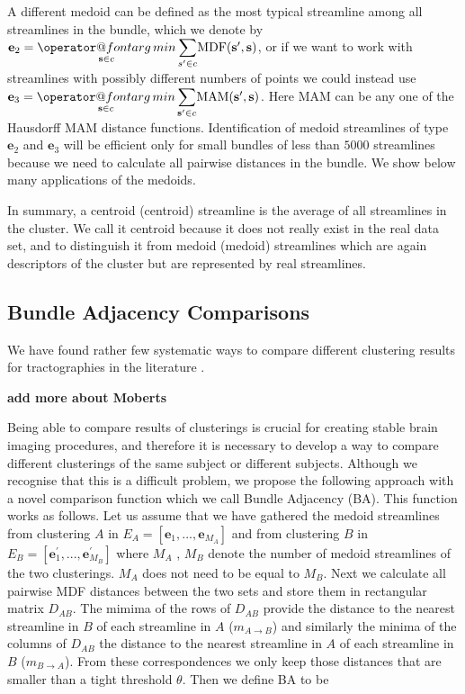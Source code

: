 \documentclass{bioinfo}
\makeatletter
\def\argmin{\mathop{\operator@font arg\,min}}
\makeatother
\begin{document}
\begin{methods}
A different medoid can be defined as the most typical streamline among
all streamlines in the bundle, which we denote by
$\mathbf{e}_{2}={\displaystyle \argmin_{\mathbf{s} \in
    c}}\,{\displaystyle \sum_{s'\in
    c}}\mathrm{MDF}(\mathbf{s'},\mathbf{s})$, or if we want to work with
streamlines with possibly different numbers of points we could instead
use $\mathbf{e}_{3}={\displaystyle \argmin_{\mathbf{s} \in
    c}}\,{\displaystyle \sum_{\mathbf{s'}\in
    c}}\mathrm{MAM}(\mathbf{s'},\mathbf{s})$.  Here $\mathrm{MAM}$ can
be any one of the Hausdorff MAM distance functions.  Identification of
medoid streamlines of type $\mathbf{e}_{2}$ and $\mathbf{e}_{3}$ will
be efficient only for small bundles of less than $5000$ streamlines
because we need to calculate all pairwise distances in the bundle. We
show below many applications of the medoids.

In summary, a centroid (centroid) streamline is the average of all
streamlines in the cluster. We call it centroid because it does not
really exist in the real data set, and to distinguish it from medoid
(medoid) streamlines which are again descriptors of the cluster but are
represented by real streamlines.

\subsection{Bundle Adjacency Comparisons\label{sub:Tightness-comparisons-1}}

We have found rather few systematic ways to compare different clustering
results for tractographies in the literature
\citep{moberts2005evaluation}.  

\textbf{add more about Moberts}

Being able to compare results of clusterings is crucial for creating
stable brain imaging procedures, and therefore it is necessary to
develop a way to compare different clusterings of the same subject or
different subjects. Although we recognise that this is a difficult
problem, we propose the following approach with a novel comparison
function which we call Bundle Adjacency (BA). This function works as
follows. Let us assume that we have gathered the medoid streamlines from
clustering $A$ in $E_{A}=[\mathbf{e}_{1},...,\mathbf{e}_{M_{A}}]$ and
from clustering $B$ in
$E_{B}=[\mathbf{e}_{1}^{'},...,\mathbf{e}_{M_{B}}^{'}]$ where $M_A$ ,
$M_B$ denote the number of medoid streamlines of the two
clusterings. $M_{A}$ does not need to be equal to $M_{B}$. Next we
calculate all pairwise MDF distances between the two sets and store them
in rectangular matrix $D_{AB}$. The mimima of the rows of $D_{AB}$
provide the distance to the nearest streamline in $B$ of each streamline
in $A$ ($m_{A\rightarrow B}$) and similarly the minima of the columns of
$D_{AB}$ the distance to the nearest streamline in $A$ of each
streamline in $B$ ($m_{B\rightarrow A}$). From these correspondences we
only keep those distances that are smaller than a tight threshold
$\theta$. Then we define BA to be


\end{methods}
\end{document}
